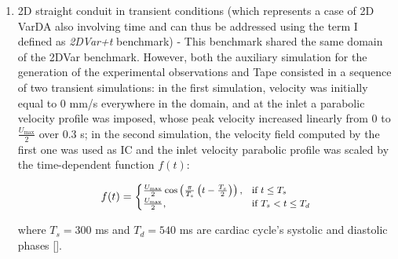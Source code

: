 \begin{enumerate}
    \item 2D straight conduit in transient conditions (which represents a case of 2D VarDA also involving time and can thus be addressed using the term I defined as \emph{2DVar+t} benchmark) - This benchmark shared the same domain of the 2DVar benchmark. However, both the auxiliary simulation for the generation of the experimental observations and Tape consisted in a sequence of two transient simulations: in the first simulation, velocity was initially equal to 0 mm/s everywhere in the domain, and at the inlet a parabolic velocity profile was imposed, whose peak velocity increased linearly from 0 to \( \frac{ U_{\text{max}}}{2} \) over 0.3 s; in the second simulation, the velocity field computed by the first one was used as IC and the inlet velocity parabolic profile was scaled by the time-dependent function \( f(t) \):

\begin{equation}
\small
f(t) = 
\begin{cases}
\frac{U_{\text{max}}}{2}\cos\left(\frac{\pi}{T_s}\left(t - \frac{T_s}{2}\right)\right), & \text{if } t \leq T_s \\
\frac{U_{\text{max}}}{2}, & \text{if } T_s < t \leq T_d
\label{eq:13}
\end{cases}
\end{equation}

where \( T_s = 300 \) ms and \( T_d = 540 \) ms are cardiac cycle's systolic and diastolic phases [\cite{Katz1977}]. 


\end{enumerate}
